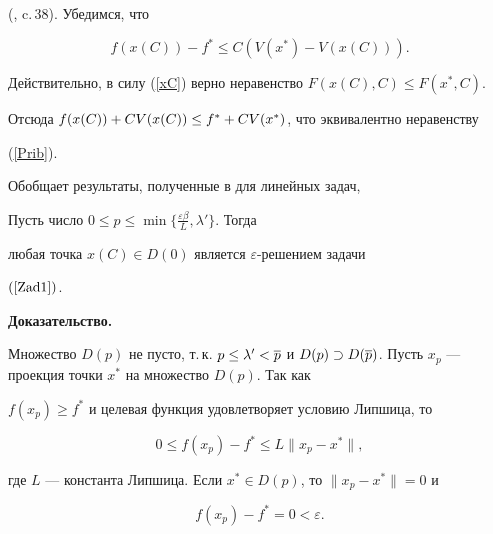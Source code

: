(\cite{Fed}, c.\,38). Убедимся, что


\begin{equation}\label{Prib}


f(x(C))-f^*\leq C(V(x^*)-V(x(C))).


\end{equation}


Действительно, в силу (\ref{xC}) верно неравенство $F(x(C), C)\leq F(x^*, C)$.


Отсюда $f(x(C))+\linebreak CV(x(C))\leq f^*+CV(x^*)$, что эквивалентно неравенству


(\ref{Prib}).





Обобщает результаты, полученные в \cite{fookin} для линейных задач,





\begin{thm}\label{p}


Пусть число $0\leq p\leq\min\{\frac{\varepsilon\beta}{L},\lambda'\}$. Тогда


любая точка $x(C)\in D(0)$ является $\varepsilon$-решением задачи


$(\ref{Zad1})$.


\end{thm}





{\bf Доказательство.}


Множество $D(p)$ не пусто, т.\,к. $p\leq\lambda'<\o p$ и $D(p)\supset D(\o


p)$. Пусть $x_p$ --- проекция точки $x^*$ на множество $D(p)$. Так как


$f(x_p)\geq f^*$ и целевая функция удовлетворяет условию Липшица, то


\begin{equation}\label{fxp1}


0\leq f(x_p)-f^*\leq L\|x_p-x^*\|,


\end{equation}


где $L$ --- константа Липшица. Если $x^*\in D(p)$, то $\|x_p-x^*\|=0$ и


\begin{equation}\label{fxp2}


f(x_p)-f^*=0<\varepsilon.


\end{equation}


